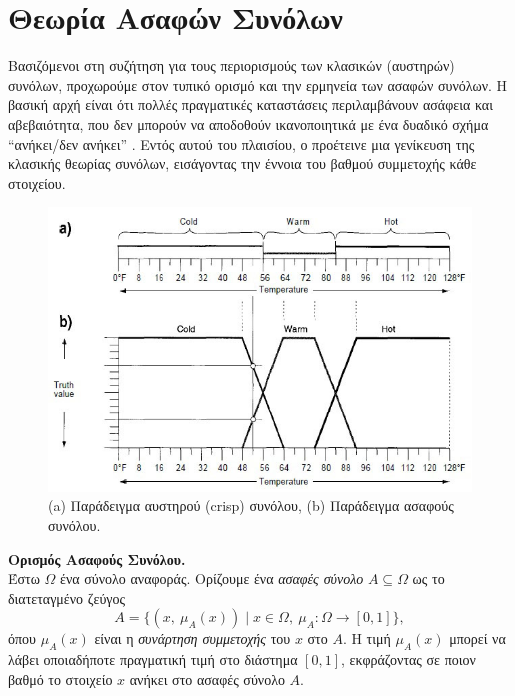 \section{Θεωρία Ασαφών Συνόλων}
Βασιζόμενοι στη συζήτηση για τους περιορισμούς των κλασικών (αυστηρών) συνόλων, προχωρούμε στον τυπικό ορισμό και την ερμηνεία των ασαφών συνόλων. Η βασική αρχή είναι ότι πολλές πραγματικές καταστάσεις περιλαμβάνουν ασάφεια και αβεβαιότητα, που δεν μπορούν να αποδοθούν ικανοποιητικά με ένα δυαδικό σχήμα ``ανήκει/δεν ανήκει'' \cite{Zadeh1965,KlirYuan}. Εντός αυτού του πλαισίου, ο  προέτεινε μια γενίκευση της κλασικής θεωρίας συνόλων, εισάγοντας την έννοια του βαθμού συμμετοχής κάθε στοιχείου.

\begin{figure}[h!] \includegraphics[scale=0.7]{images/fuzzy_logic1.jpg} \centering \caption{(\textlatin{a}) Παράδειγμα αυστηρού (\textlatin{crisp}) συνόλου, (\textlatin{b}) Παράδειγμα ασαφούς συνόλου.} \label{char_fun1} \end{figure}

\medskip

\begin{definition}
	\label{def:fuzzyset}
	\textbf{Ορισμός Ασαφούς Συνόλου.}\\
	Έστω \(\Omega\) ένα σύνολο αναφοράς. Ορίζουμε ένα \emph{ασαφές σύνολο} \(A \subseteq \Omega\) ως το διατεταγμένο ζεύγος
	\begin{equation}
	\label{eq:1}
	A = \{(x,\ \mu_{A}(x)) \mid x \in \Omega,\ \mu_{A}: \Omega \rightarrow [0,1]\},
	\end{equation}
	όπου \(\mu_{A}(x)\) είναι η \emph{συνάρτηση συμμετοχής} του \(x\) στο \(A\). Η τιμή \(\mu_{A}(x)\) μπορεί να λάβει οποιαδήποτε πραγματική τιμή στο διάστημα \([0,1]\), εκφράζοντας σε ποιον βαθμό το στοιχείο \(x\) ανήκει στο ασαφές σύνολο \(A\).
\end{definition}

